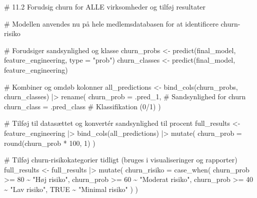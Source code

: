 \documentclass[
  11pt,
  letterpaper,
  DIV=11,
  numbers=noendperiod]{scrartcl}
\newenvironment{Shaded}{\begin{snugshade}}{\end{snugshade}}
\newcommand{\AttributeTok}[1]{\textcolor[rgb]{0.40,0.45,0.13}{#1}}
\newcommand{\CommentTok}[1]{\textcolor[rgb]{0.37,0.37,0.37}{#1}}
\newcommand{\ConstantTok}[1]{\textcolor[rgb]{0.56,0.35,0.01}{#1}}
\newcommand{\DecValTok}[1]{\textcolor[rgb]{0.68,0.00,0.00}{#1}}
\newcommand{\FunctionTok}[1]{\textcolor[rgb]{0.28,0.35,0.67}{#1}}
\newcommand{\NormalTok}[1]{\textcolor[rgb]{0.00,0.23,0.31}{#1}}
\newcommand{\OtherTok}[1]{\textcolor[rgb]{0.00,0.23,0.31}{#1}}
\newcommand{\SpecialCharTok}[1]{\textcolor[rgb]{0.37,0.37,0.37}{#1}}
\newcommand{\StringTok}[1]{\textcolor[rgb]{0.13,0.47,0.30}{#1}}
\begin{document}
\begin{Shaded}
\begin{Highlighting}[]
\CommentTok{\# 11.2 Forudsig churn for ALLE virksomheder og tilføj resultater}


\CommentTok{\# Modellen anvendes nu på hele medlemsdatabasen for at identificere churn{-}risiko}

\CommentTok{\# Forudsiger sandsynlighed og klasse}
\NormalTok{churn\_probs   }\OtherTok{\textless{}{-}} \FunctionTok{predict}\NormalTok{(final\_model, feature\_engineering, }\AttributeTok{type =} \StringTok{"prob"}\NormalTok{)}
\NormalTok{churn\_classes }\OtherTok{\textless{}{-}} \FunctionTok{predict}\NormalTok{(final\_model, feature\_engineering)}

\CommentTok{\# Kombiner og omdøb kolonner}
\NormalTok{all\_predictions }\OtherTok{\textless{}{-}} \FunctionTok{bind\_cols}\NormalTok{(churn\_probs, churn\_classes) }\SpecialCharTok{|\textgreater{}} 
  \FunctionTok{rename}\NormalTok{(}
    \AttributeTok{churn\_prob =}\NormalTok{ .pred\_1,      }\CommentTok{\# Sandsynlighed for churn}
    \AttributeTok{churn\_class =}\NormalTok{ .pred\_class  }\CommentTok{\# Klassifikation (0/1)}
\NormalTok{  )}

\CommentTok{\# Tilføj til datasættet og konvertér sandsynlighed til procent}
\NormalTok{full\_results }\OtherTok{\textless{}{-}}\NormalTok{ feature\_engineering }\SpecialCharTok{|\textgreater{}} 
  \FunctionTok{bind\_cols}\NormalTok{(all\_predictions) }\SpecialCharTok{|\textgreater{}} 
  \FunctionTok{mutate}\NormalTok{(}
    \AttributeTok{churn\_prob =} \FunctionTok{round}\NormalTok{(churn\_prob }\SpecialCharTok{*} \DecValTok{100}\NormalTok{, }\DecValTok{1}\NormalTok{)}
\NormalTok{  ) }

\CommentTok{\# Tilføj churn{-}risikokategorier tidligt (bruges i visualiseringer og rapporter)}
\NormalTok{full\_results }\OtherTok{\textless{}{-}}\NormalTok{ full\_results }\SpecialCharTok{|\textgreater{}} 
  \FunctionTok{mutate}\NormalTok{(}
    \AttributeTok{churn\_risiko =} \FunctionTok{case\_when}\NormalTok{(}
\NormalTok{      churn\_prob }\SpecialCharTok{\textgreater{}=} \DecValTok{80} \SpecialCharTok{\textasciitilde{}} \StringTok{"Høj risiko"}\NormalTok{,}
\NormalTok{      churn\_prob }\SpecialCharTok{\textgreater{}=} \DecValTok{60} \SpecialCharTok{\textasciitilde{}} \StringTok{"Moderat risiko"}\NormalTok{,}
\NormalTok{      churn\_prob }\SpecialCharTok{\textgreater{}=} \DecValTok{40} \SpecialCharTok{\textasciitilde{}} \StringTok{"Lav risiko"}\NormalTok{,}
      \ConstantTok{TRUE}             \SpecialCharTok{\textasciitilde{}} \StringTok{"Minimal risiko"}
\NormalTok{    )}
\NormalTok{  )}



\end{Highlighting}
\end{Shaded}
\end{document}
